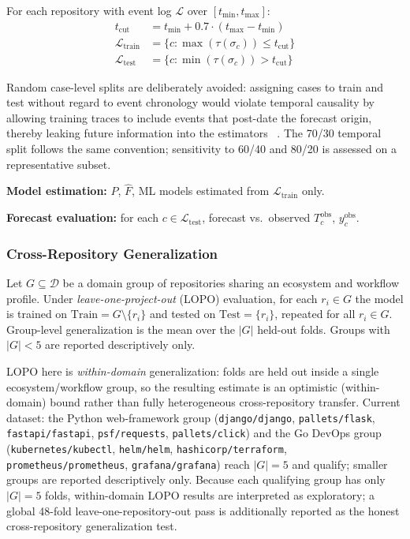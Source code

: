 \begin{definition}
\label{def:temporal-holdout}
For each repository with event log $\mathcal{L}$ over
$[t_{\min}, t_{\max}]$:
\begin{align}
t_{\text{cut}} &= t_{\min} + 0.7 \cdot (t_{\max} - t_{\min})
    \label{eq:cutoff} \\
\mathcal{L}_{\text{train}} &= \{c : \max(\tau(\sigma_c)) \leq t_{\text{cut}}\}
    \label{eq:train-set} \\
\mathcal{L}_{\text{test}}  &= \{c : \min(\tau(\sigma_c)) > t_{\text{cut}}\}
    \label{eq:test-set}
\end{align}
\end{definition}

Random case-level splits are deliberately avoided: assigning cases to train
and test without regard to event chronology would violate temporal causality
by allowing training traces to include events that post-date the forecast
origin, thereby leaking future information into the estimators
~\cite{tashman2000out}. The 70/30 temporal split follows the same
convention; sensitivity to 60/40 and 80/20 is assessed on a representative
subset.

\textbf{Model estimation:} $P$, $\hat{F}$, ML models estimated from
$\mathcal{L}_{\text{train}}$ only.

\textbf{Forecast evaluation:} for each $c \in \mathcal{L}_{\text{test}}$,
forecast vs.\ observed $T_c^{\text{obs}}$, $y_c^{\text{obs}}$.


\subsubsection{Cross-Repository Generalization}
\label{sec:cross-repo}

\begin{definition}
\label{def:lopo}
Let $G \subseteq \mathcal{D}$ be a domain group of repositories sharing an
ecosystem and workflow profile. Under \emph{leave-one-project-out} (LOPO)
evaluation, for each $r_i \in G$ the model is trained on
$\text{Train} = G \setminus \{r_i\}$ and tested on $\text{Test} = \{r_i\}$,
repeated for all $r_i \in G$. Group-level generalization is the mean over the
$|G|$ held-out folds. Groups with $|G| < 5$ are reported descriptively only.
\end{definition}

LOPO here is \emph{within-domain} generalization: folds are held out inside a
single ecosystem/workflow group, so the resulting estimate is an optimistic
(within-domain) bound rather than fully heterogeneous cross-repository
transfer. Current dataset: the Python web-framework group
(\texttt{django/django}, \texttt{pallets/flask}, \texttt{fastapi/fastapi},
\texttt{psf/requests}, \texttt{pallets/click}) and the Go DevOps group
(\texttt{kubernetes/kubectl}, \texttt{helm/helm},
\texttt{hashicorp/terraform}, \texttt{prometheus/prometheus},
\texttt{grafana/grafana}) reach $|G|=5$ and qualify; smaller groups are
reported descriptively only. Because each qualifying group has only $|G|=5$
folds, within-domain LOPO results are interpreted as exploratory; a global
48-fold leave-one-repository-out pass is additionally reported as the honest
cross-repository generalization test.


